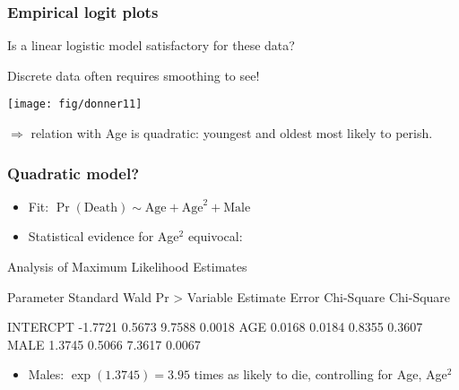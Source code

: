 \begin{frame}[fragile]
\frametitle{Empirical logit plots}
\begin{itemize*}
	\item Is a linear logistic model satisfactory for these data?
	\item Discrete data often requires smoothing to see!
\end{itemize*}

\begin{Input}
\end{Input}

\begin{center}
  \texttt{[image: fig/donner11]}
\end{center}
$\Rightarrow$ relation with Age is quadratic: youngest and oldest most
likely to perish.
\end{frame}

\begin{frame}[fragile]
\frametitle{Quadratic model?}
\begin{itemize}
	\item Fit: $\Pr(\mbox{Death}) \sim \mbox{Age} + \mbox{Age}^2 + \mbox{Male}$
	\item Statistical evidence for Age$^2$ equivocal:
\end{itemize}
\begin{Output}
        Analysis of Maximum Likelihood Estimates
 
         Parameter  Standard    Wald         Pr >
Variable  Estimate    Error  Chi-Square   Chi-Square 

INTERCPT   -1.7721    0.5673     9.7588     0.0018
AGE         0.0168    0.0184     0.8355     0.3607 
MALE        1.3745    0.5066     7.3617     0.0067     
\end{Output}
\begin{itemize}
\item Males: $\exp(1.3745) = 3.95$ times as likely to die, controlling for Age, Age$^2$
\end{itemize}

\end{frame}

